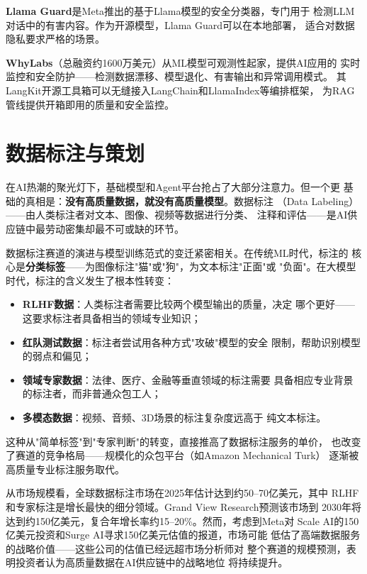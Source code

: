 \textbf{Llama Guard}是Meta推出的基于Llama模型的安全分类器，专门用于
检测LLM对话中的有害内容。作为开源模型，Llama Guard可以在本地部署，
适合对数据隐私要求严格的场景。

\textbf{WhyLabs}（总融资约1600万美元）从ML模型可观测性起家，提供AI应用的
实时监控和安全防护——检测数据漂移、模型退化、有害输出和异常调用模式。
其LangKit开源工具箱可以无缝接入LangChain和LlamaIndex等编排框架，
为RAG管线提供开箱即用的质量和安全监控。


\section{数据标注与策划}
\label{sec:platform-data}

在AI热潮的聚光灯下，基础模型和Agent平台抢占了大部分注意力。但一个更
基础的真相是：\textbf{没有高质量数据，就没有高质量模型}。数据标注
（Data Labeling）——由人类标注者对文本、图像、视频等数据进行分类、
注释和评估——是AI供应链中最劳动密集却最不可或缺的环节。

数据标注赛道的演进与模型训练范式的变迁紧密相关。在传统ML时代，标注的
核心是\textbf{分类标签}——为图像标注"猫"或"狗"，为文本标注"正面"或
"负面"。在大模型时代，标注的含义发生了根本性转变：
\begin{itemize}
  \item \textbf{RLHF数据}：人类标注者需要比较两个模型输出的质量，决定
    哪个更好——这要求标注者具备相当的领域专业知识；
  \item \textbf{红队测试数据}：标注者尝试用各种方式"攻破"模型的安全
    限制，帮助识别模型的弱点和偏见；
  \item \textbf{领域专家数据}：法律、医疗、金融等垂直领域的标注需要
    具备相应专业背景的标注者，而非普通众包工人；
  \item \textbf{多模态数据}：视频、音频、3D场景的标注复杂度远高于
    纯文本标注。
\end{itemize}

这种从"简单标签"到"专家判断"的转变，直接推高了数据标注服务的单价，
也改变了赛道的竞争格局——规模化的众包平台（如Amazon Mechanical Turk）
逐渐被高质量专业标注服务取代。

从市场规模看，全球数据标注市场在2025年估计达到约50--70亿美元，其中
RLHF和专家标注是增长最快的细分领域。Grand View Research预测该市场到
2030年将达到约150亿美元，复合年增长率约15--20\%。然而，考虑到Meta对
Scale AI的150亿美元投资和Surge AI寻求150亿美元估值的报道，市场可能
低估了高端数据服务的战略价值——这些公司的估值已经远超市场分析师对
整个赛道的规模预测，表明投资者认为高质量数据在AI供应链中的战略地位
将持续提升。

